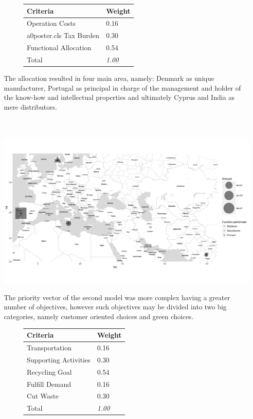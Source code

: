 \documentclass[a0,portrait]{a0poster}
\begin{document}
\begin{multicols}{2}
\begin{figure}
\begin{tabular}{l l}
\toprule
\textbf{Criteria} & \textbf{Weight} \\
\midrule
Operation Costs & 0.16 \\a0poster.cls
Tax Burden & 0.30 \\
Functional Allocation & 0.54 \\
Total & \textit{1.00} \\
\bottomrule
\end{tabular}
\end{figure}

The allocation resulted in four main area, namely: Denmark as unique manufacturer, Portugal as principal in charge of the management and holder of the know-how and intellectual properties and ultimately Cyprus and India as mere distributors.
\\
\\
\\
\begin{center}\vspace{1cm}
\includegraphics[width=0.8\linewidth]{allocation_map.png}
\end{center}\vspace{1cm}

The priority vector of the second model was more complex having a greater number of objectives, however such objectives may be divided into two big categories, namely customer oriented choices and green choices. 

\begin{figure}
\begin{tabular}{l l}
\toprule
\textbf{Criteria} & \textbf{Weight} \\
\midrule
Transportation & 0.16 \\
Supporting Activities & 0.30 \\
Recycling Goal & 0.54 \\
Fulfill Demand & 0.16 \\
Cut Waste & 0.30 \\
Total & \textit{1.00} \\
\bottomrule
\end{tabular}
\end{figure}


\end{multicols}
\end{document}
